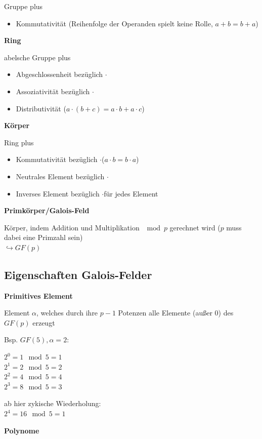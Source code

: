 Gruppe plus
\begin{itemize}
    \item Kommutativität (Reihenfolge der Operanden spielt keine Rolle, $a + b = b + a$)
\end{itemize}

\textbf{Ring}

abelsche Gruppe plus
\begin{itemize}
    \item Abgeschlossenheit bezüglich \frqq $\cdot$\flqq
    \item Assoziativität bezüglich \frqq $\cdot$\flqq
    \item Distributivität ($a \cdot (b + c) = a \cdot b + a \cdot c$)
\end{itemize}

\textbf{Körper}

Ring plus
\begin{itemize}
    \item Kommutativität bezüglich \frqq $\cdot$\flqq ($a \cdot b = b \cdot a$)
    \item Neutrales Element bezüglich \frqq $\cdot$\flqq
    \item Inverses Element bezüglich \frqq $\cdot$\flqq für jedes Element
\end{itemize}

\textbf{Primkörper/Galois-Feld}

Körper, indem Addition und Multiplikation $\mod p$ gerechnet wird ($p$ muss dabei eine Primzahl sein)\\
$\hookrightarrow GF(p)$

\subsection{Eigenschaften Galois-Felder}

\textbf{Primitives Element}

Element $\alpha$, welches durch ihre $p-1$ Potenzen alle Elemente (außer $0$) des $GF(p)$ erzeugt

Bsp. $GF(5), \alpha = 2$:

$2^0 = 1 \mod 5 = 1$\\
$2^1 = 2 \mod 5 = 2$\\
$2^2 = 4 \mod 5 = 4$\\
$ 2^3 = 8 \mod 5 = 3$

ab hier zykische Wiederholung:\\
$2^4 = 16 \mod 5 = 1$

\textbf{Polynome}

